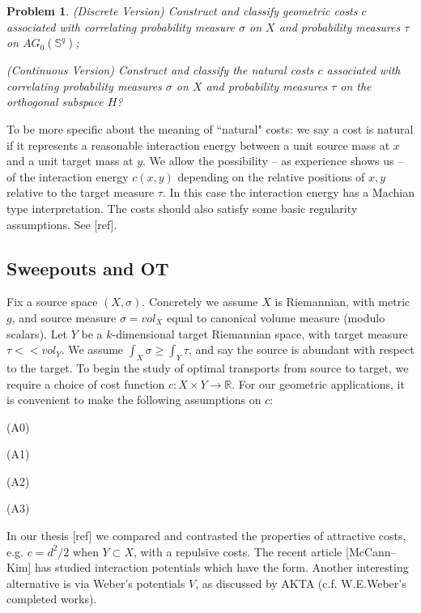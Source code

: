 \documentclass[12pt]{amsart}
\newtheorem{prob}{Problem}
\theoremstyle{definition}
\theoremstyle{remark}
\newcommand{\bR}{\mathbb{R}}
\begin{document}
\begin{prob} 
(Discrete Version) Construct and classify geometric costs $c$ associated with correlating probability measure $\sigma$ on $X$ and probability measures $\tau$ on $AG_0(\mathbb{S}^q)$;

(Continuous Version) Construct and classify the natural costs $c$ associated with correlating probability measures $\sigma$ on $X$ and probability measures $\tau$ on the orthogonal subspace $H$? 
\end{prob}

To be more specific about the meaning of ``natural" costs: we say a cost is natural if it represents a reasonable interaction energy between a unit source mass at $x$ and a unit target mass at $y$. We allow the possibility -- as experience shows us -- of the interaction energy $c(x,y)$ depending on the relative positions of $x,y$ relative to the target measure $\tau$. In this case the interaction energy has a Machian type interpretation. The costs should also satisfy some basic regularity assumptions. See [ref]. 



\subsection{Sweepouts and OT}

Fix a source space $(X, \sigma)$. Concretely we assume $X$ is Riemannian, with metric $g$, and source measure $\sigma=vol_X$ equal to canonical volume measure (modulo scalars). Let $Y$ be a $k$-dimensional target Riemannian space, with target measure $\tau<<vol_Y$. We assume $\int_X \sigma \geq \int_Y \tau$, and say the source is abundant with respect to the target. To begin the study of optimal transports from source to target, we require a choice of cost function $c: X\times Y \to \bR$. For our geometric applications, it is convenient to make the following assumptions on $c$: 

(A0)

(A1)

(A2)

(A3)

In our thesis [ref] we compared and contrasted the properties of attractive costs, e.g. $c=d^2/2$ when $Y\subset X$, with a repulsive costs. The recent article [McCann--Kim] has studied interaction potentials which have the form. Another interesting alternative is via Weber's potentials $V$, as discussed by AKTA (c.f. W.E.Weber's completed works).
\end{document}
